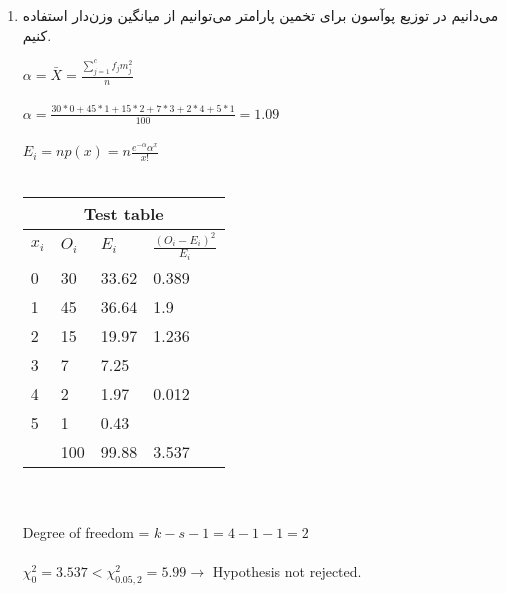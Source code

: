 \begin{enumerate}
    \item \phantom{text}

می‌دانیم در توزیع پوآسون برای تخمین پارامتر می‌توانیم از میانگین وزن‌دار استفاده کنیم.
\\
\begin{latin}
    \noindent
    $\alpha = \bar{X} = \frac{\sum_{j=1}^{c}f_jm_j^2}{n}$ \\\\
    $\alpha = \frac{30 * 0 + 45 * 1 + 15 *2 + 7 * 3 + 2 * 4 + 5 * 1}{100} = 1.09$ \\\\
    $E_i = np(x) = n\frac{e^{-\alpha}\alpha^x}{x!}$\\\\
\end{latin}
\begin{latin}
    \noindent
    \begin{tabular}{ |p{3cm}||p{3cm}|p{3cm}|p{3cm}|  }
        \hline
        \multicolumn{4}{|c|}{Test table}                    \\
        \hline
        $x_i$ & $O_i$ & $E_i$ & $\frac{(O_i-E_i)^2}{E_i}$   \\
        \hline
        0     & 30    & 33.62   & 0.389                        \\
        1     & 45    & 36.64   & 1.9                         \\
        2     & 15    & 19.97   & 1.236                         \\
        3     & 7    & 7.25   &                          \\
        4     & 2    & 1.97   & 0.012                         \\
        5     & 1    & 0.43   &                          \\
        \hline
              & 100      &  99.88      & 3.537                          \\
        \hline
    \end{tabular}
    \\\\
    Degree of freedom = $k-s-1=4 - 1 -1 = 2$ \\\\
    $\chi_0^2 = 3.537 < \chi_{0.05,2}^2=5.99 \rightarrow$ Hypothesis not rejected.
\end{latin}


\end{enumerate}
